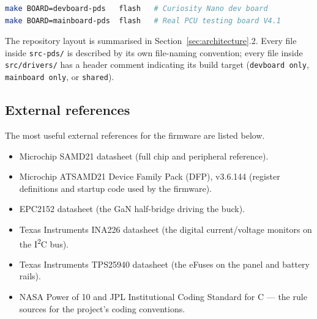 \begin{lstlisting}[language=bash]
make BOARD=devboard-pds   flash   # Curiosity Nano dev board
make BOARD=mainboard-pds  flash   # Real PCU testing board V4.1
\end{lstlisting}

The repository layout is summarised in Section~\ref{sec:architecture}.2.
Every file inside \texttt{src-pds/} is described by its own
file-naming convention; every file inside \texttt{src/drivers/}
has a header comment indicating its build target (\texttt{devboard
only}, \texttt{mainboard only}, or \texttt{shared}).

\subsection{External references}

The most useful external references for the firmware are listed
below.

\begin{itemize}
\item Microchip SAMD21 datasheet (full chip and peripheral
reference).
\item Microchip ATSAMD21 Device Family Pack (DFP), v3.6.144
(register definitions and startup code used by the firmware).
\item EPC2152 datasheet (the GaN half-bridge driving the buck).
\item Texas Instruments INA226 datasheet (the digital
current/voltage monitors on the I\textsuperscript{2}C bus).
\item Texas Instruments TPS25940 datasheet (the eFuses on the
panel and battery rails).
\item NASA Power of 10 \cite{holzmann_powerof10_2006} and JPL
Institutional Coding Standard for C \cite{jpl_d60411_2009} ---
the rule sources for the project's coding conventions.
\end{itemize}
